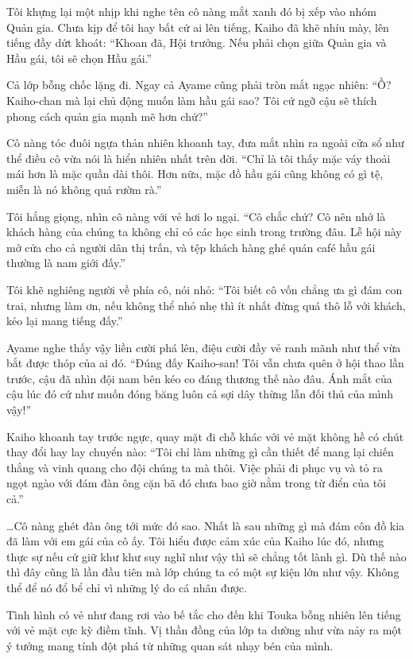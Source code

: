 \documentclass[../main.tex]{subfiles}
\begin{document}
Tôi khựng lại một nhịp khi nghe tên cô nàng mắt xanh đó bị xếp vào nhóm Quản gia. Chưa kịp để tôi hay bất cứ ai lên tiếng, Kaiho đã khẽ nhíu mày, lên tiếng đầy dứt khoát: ``Khoan đã, Hội trưởng. Nếu phải chọn giữa Quản gia và Hầu gái, tôi sẽ chọn Hầu gái.''

Cả lớp bỗng chốc lặng đi. Ngay cả Ayame cũng phải tròn mắt ngạc nhiên: ``Ồ? Kaiho-chan mà lại chủ động muốn làm hầu gái sao? Tôi cứ ngỡ cậu sẽ thích phong cách quản gia mạnh mẽ hơn chứ?''

Cô nàng tóc đuôi ngựa thản nhiên khoanh tay, đưa mắt nhìn ra ngoài cửa sổ như thể điều cô vừa nói là hiển nhiên nhất trên đời. ``Chỉ là tôi thấy mặc váy thoải mái hơn là mặc quần dài thôi. Hơn nữa, mặc đồ hầu gái cũng không có gì tệ, miễn là nó không quá rườm rà.''

Tôi hắng giọng, nhìn cô nàng với vẻ hơi lo ngại. ``Cô chắc chứ? Cô nên nhớ là khách hàng của chúng ta không chỉ có các học sinh trong trường đâu. Lễ hội này mở cửa cho cả người dân thị trấn, và tệp khách hàng ghé quán café hầu gái thường là nam giới đấy.''

Tôi khẽ nghiêng người về phía cô, nói nhỏ: ``Tôi biết cô vốn chẳng ưa gì đám con trai, nhưng làm ơn, nếu không thể nhỏ nhẹ thì ít nhất đừng quá thô lỗ với khách, kẻo lại mang tiếng đấy.''

Ayame nghe thấy vậy liền cười phá lên, điệu cười đầy vẻ ranh mãnh như thể vừa bắt được thóp của ai đó. ``Đúng đấy Kaiho-san! Tôi vẫn chưa quên ở hội thao lần trước, cậu đã nhìn đội nam bên kéo co đáng thương thế nào đâu. Ánh mắt của cậu lúc đó cứ như muốn đóng băng luôn cả sợi dây thừng lẫn đối thủ của mình vậy!''

Kaiho khoanh tay trước ngực, quay mặt đi chỗ khác với vẻ mặt không hề có chút thay đổi hay lay chuyển nào: ``Tôi chỉ làm những gì cần thiết để mang lại chiến thắng và vinh quang cho đội chúng ta mà thôi. Việc phải đi phục vụ và tỏ ra ngọt ngào với đám đàn ông cặn bã đó chưa bao giờ nằm trong từ điển của tôi cả.''

\dots Cô nàng ghét đàn ông tới mức đó sao. Nhất là sau những gì mà đám côn đồ kia đã làm với em gái của cô ấy. Tôi hiểu được cảm xúc của Kaiho lúc đó, nhưng thực sự nếu cứ giữ khư khư suy nghĩ như vậy thì sẽ chẳng tốt lành gì. Dù thế nào thì đây cũng là lần đầu tiên mà lớp chúng ta có một sự kiện lớn như vậy. Không thể để nó đổ bể chỉ vì những lý do cá nhân được.

Tình hình có vẻ như đang rơi vào bế tắc cho đến khi Touka bỗng nhiên lên tiếng với vẻ mặt cực kỳ điềm tĩnh. Vị thần đồng của lớp ta dường như vừa nảy ra một ý tưởng mang tính đột phá từ những quan sát nhạy bén của mình.
\end{document}

